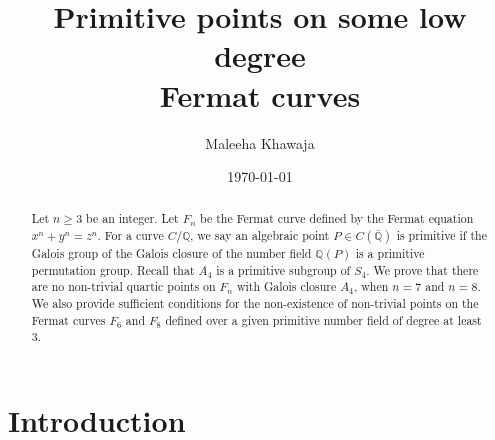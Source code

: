 \documentclass{amsart}
\title[Primitive points on some low degree Fermat curves]{Primitive points on some low degree\\ Fermat curves}
\author{Maleeha Khawaja}
\date{\today}
\theoremstyle{definition}
\newcommand{\Q}{\mathbb{Q}}
\begin{document}
\begin{abstract} 
Let $n\geq 3$ be an integer. Let $F_n$ be the Fermat curve defined by the Fermat equation $x^n+y^n=z^n$. For a curve $C/\Q$, we say an algebraic point $P\in C(\bar{\Q})$ is primitive if the Galois group of the Galois closure of the number field $\Q(P)$ is a primitive permutation group. Recall that $A_4$ is a primitive subgroup of $S_4$. We prove that there are no non-trivial quartic points on $F_n$ with Galois closure $A_4$, when $n=7$ and $n=8$. We also provide sufficient conditions for the non-existence of non-trivial points on the Fermat curves $F_6$ and $F_8$ defined over a given primitive number field of degree at least $3$.  
\end{abstract}

\maketitle

\section{Introduction}
\end{document}

